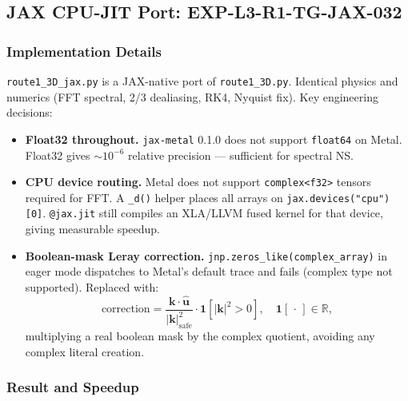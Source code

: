 \documentclass[11pt, a4paper]{article}
\theoremstyle{definition}
\theoremstyle{remark}
\begin{document}
\subsection{JAX CPU-JIT Port: EXP-L3-R1-TG-JAX-032}

\subsubsection{Implementation Details}

\texttt{route1\_3D\_jax.py} is a JAX-native port of \texttt{route1\_3D.py}.
Identical physics and numerics (FFT spectral, 2/3 dealiasing, RK4, Nyquist fix).
Key engineering decisions:

\begin{itemize}[leftmargin=1.5em]
  \item \textbf{Float32 throughout.} \texttt{jax-metal} 0.1.0 does not support
        \texttt{float64} on Metal. Float32 gives $\sim 10^{-6}$ relative precision
        --- sufficient for spectral NS.

  \item \textbf{CPU device routing.} Metal does not support
        \texttt{complex<f32>} tensors required for FFT. A \texttt{\_d()} helper
        places all arrays on \texttt{jax.devices("cpu")[0]}. \texttt{@jax.jit}
        still compiles an XLA/LLVM fused kernel for that device, giving measurable
        speedup.

  \item \textbf{Boolean-mask Leray correction.}
        \texttt{jnp.zeros\_like(complex\_array)} in eager mode dispatches to
        Metal's default trace and fails (complex type not supported).
        Replaced with:
        \[
          \text{correction} = \frac{\mathbf{k}\cdot\hat{\mathbf{u}}}{|\mathbf{k}|^2_{\mathrm{safe}}}
          \cdot \mathbf{1}[|\mathbf{k}|^2 > 0], \quad
          \mathbf{1}[\,\cdot\,]\in\mathbb{R},
        \]
        multiplying a real boolean mask by the complex quotient, avoiding any
        complex literal creation.
\end{itemize}

\subsubsection{Result and Speedup}
\end{document}
